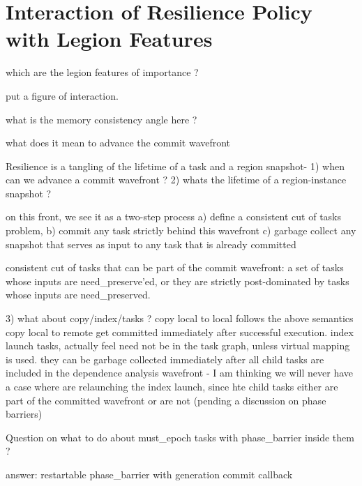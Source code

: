 
\section{Interaction of Resilience Policy with Legion Features} 

which are the legion features of importance ?

put a figure of interaction.

what is the memory consistency angle here ?

what does it mean to advance the commit wavefront

Resilience is a tangling of the lifetime of a task and a region snapshot- 
1) when can we advance a commit wavefront ?
2) whats the lifetime of a region-instance snapshot ?

on this front, we see it as a two-step process a) define a consistent cut of tasks problem, b) commit any task strictly behind this wavefront c) garbage collect any snapshot that serves as input to any task that is already committed

consistent cut of tasks that can be part of the commit wavefront: 
a set of tasks whose inputs are need\_preserve'ed, or they are strictly post-dominated by tasks whose inputs are need\_preserved.  

3) what about copy/index/tasks ?
copy local to local follows the above semantics
copy local to remote get committed immediately after successful execution.
index launch tasks, actually feel need not be in the task graph, unless virtual mapping is used. they can be garbage collected immediately after all child tasks are included in the dependence analysis wavefront
  - I am thinking we will never have a case where are relaunching the index launch, since hte child tasks either are part of the committed wavefront or are not (pending a discussion on phase barriers)

Question on what to do about must\_epoch tasks with phase\_barrier inside them ?

answer: restartable phase\_barrier with generation commit callback 

